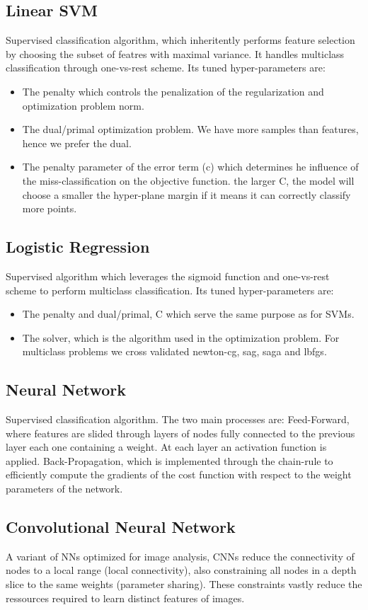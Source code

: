 \documentclass[10pt, hidelinks]{article}
\begin{document}
\subsection*{Linear SVM}
Supervised classification algorithm, which inheritently performs feature selection by choosing the subset of featres with maximal variance. It handles multiclass classification through one-vs-rest scheme. Its tuned hyper-parameters are:
\begin{itemize}
    \item The penalty which controls the penalization of the regularization and optimization problem norm.
    \item The dual/primal optimization problem. We have more samples than features, hence we prefer the dual.
    \item The penalty parameter of the error term (c) which determines he influence of the miss-classification on the objective function. the larger C, the model will choose a smaller the hyper-plane margin if it means it can correctly classify more points. 
\end{itemize}
\subsection*{Logistic Regression}
Supervised algorithm which leverages the sigmoid function and one-vs-rest scheme to perform multiclass classification. Its tuned hyper-parameters are:
\begin{itemize}
    \item The penalty and dual/primal, C which serve the same purpose as for SVMs.
    \item The solver, which is the algorithm used in the optimization problem. For multiclass problems we cross validated newton-cg, sag, saga and lbfgs.
\end{itemize}
\subsection*{Neural Network}
Supervised classification algorithm. The two main processes are: Feed-Forward, where features are slided through layers of nodes fully connected to the previous layer each one containing a weight. At each layer an activation function is applied. Back-Propagation, which is implemented through the chain-rule to efficiently compute the gradients of the cost function with respect to the weight parameters of the network.
\subsection*{Convolutional Neural Network}
A variant of NNs optimized for image analysis, CNNs reduce the connectivity of nodes to a local range (local connectivity), also constraining all nodes in a depth slice to the same weights (parameter sharing). These constraints vastly reduce the ressources required to learn distinct features of images.
\end{document}
